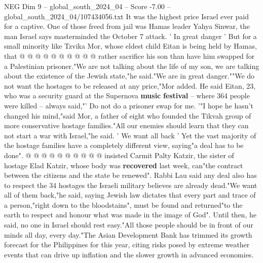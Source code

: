 \begin{textsample}{NEG Dim 9 – global\_south\_2024\_04 – Score -7.00 – global\_south\_2024\_04/107434056.txt}
It was the highest price Israel ever paid for a captive.
One of those freed from jail was Hamas leader Yahya Sinwar, the man Israel says masterminded the October 7 attack. ' In great danger ' But for a small minority like Tzvika Mor, whose eldest child Eitan is being held by Hamas, that @ @ @ @ @ @ @ @ @ @ rather sacrifice his son than have him swapped for a Palestinian prisoner."We are not talking about the life of my son, we are talking about the existence of the Jewish state,"he said."We are in great danger.""We do not want the hostages to be released at any price,"Mor added.
He said Eitan, 23, who was a security guard at the Supernova \textbf{music} \textbf{festival} -- where 364 people were killed -- always said,"' Do not do a prisoner swap for me. '"I hope he hasn't changed his mind,"said Mor, a father of eight who founded the Tikvah group of more conservative hostage families."All our enemies should learn that they can not start a war with Israel,"he said. ' We want all back ' Yet the vast majority of the hostage families have a completely different view, saying"a deal has to be done". @ @ @ @ @ @ @ @ @ @ insisted Carmit Palty Katzir, the sister of hostage Elad Katzir, whose body was \textbf{recovered} last week, can"the contract between the citizens and the state be renewed".
Rabbi Lau said any deal also has to respect the 34 hostages the Israeli military believes are already dead."We want all of them back,"he said, saying Jewish law dictates that every part and trace of a person,"right down to the bloodstains", must be found and returned"to the earth to respect and honour what was made in the image of God".
Until then, he said, no one in Israel should rest easy."All those people should be in front of our minds all day, every day."The Asian Development Bank has trimmed its growth forecast for the Philippines for this year, citing risks posed by extreme weather events that can drive up inflation and the slower growth in advanced economies.

\end{textsample}
